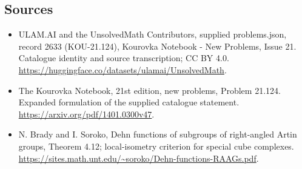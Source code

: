 \documentclass[11pt,a4paper]{article}
\begin{document}
\subsection{Sources}
\begin{itemize}
\item[S1] ULAM.AI and the UnsolvedMath Contributors, supplied problems.json, record 2633 (KOU-21.124), Kourovka Notebook - New Problems, Issue 21. Catalogue identity and source transcription; CC BY 4.0.
\url{https://huggingface.co/datasets/ulamai/UnsolvedMath}.
\item[S2] The Kourovka Notebook, 21st edition, new problems, Problem 21.124. Expanded formulation of the supplied catalogue statement.
\url{https://arxiv.org/pdf/1401.0300v47}.
\item[S3] N. Brady and I. Soroko, Dehn functions of subgroups of right-angled Artin groups, Theorem 4.12; local-isometry criterion for special cube complexes.
\url{https://sites.math.unt.edu/~soroko/Dehn-functions-RAAGs.pdf}.
\end{itemize}
\end{document}
